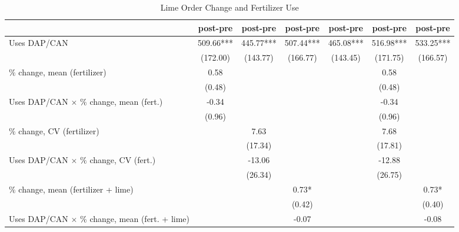 \begin{table}[htbp]
\centering
\hspace*{-1.2cm}
\begin{threeparttable}
\small
\caption{Lime Order Change and Fertilizer Use}
\label{tab:A2lime_int}
\begin{tabular}{l cccccc}
\hline
\hline
                    &\multicolumn{1}{c}{post-pre}&\multicolumn{1}{c}{post-pre}&\multicolumn{1}{c}{post-pre}&\multicolumn{1}{c}{post-pre}&\multicolumn{1}{c}{post-pre}&\multicolumn{1}{c}{post-pre}\\
\hline
Uses DAP/CAN        &      509.66***&      445.77***&      507.44***&      465.08***&      516.98***&      533.25***\\
                    &    (172.00)   &    (143.77)   &    (166.77)   &    (143.45)   &    (171.75)   &    (166.57)   \\
$\%$ change, mean (fertilizer)&        0.58   &               &               &               &        0.58   &               \\
                    &      (0.48)   &               &               &               &      (0.48)   &               \\
Uses DAP/CAN $\times$ $\%$ change, mean (fert.)&       -0.34   &               &               &               &       -0.34   &               \\
                    &      (0.96)   &               &               &               &      (0.96)   &               \\
$\%$ change, CV (fertilizer)&               &        7.63   &               &               &        7.68   &               \\
                    &               &     (17.34)   &               &               &     (17.81)   &               \\
Uses DAP/CAN $\times$ $\%$ change, CV (fert.)&               &      -13.06   &               &               &      -12.88   &               \\
                    &               &     (26.34)   &               &               &     (26.75)   &               \\
$\%$ change, mean (fertilizer + lime)&               &               &        0.73*  &               &               &        0.73*  \\
                    &               &               &      (0.42)   &               &               &      (0.40)   \\
Uses DAP/CAN $\times$ $\%$ change, mean (fert. + lime)&               &               &       -0.07   &               &               &       -0.08   \\

\end{tabular}
\end{threeparttable}
\end{table}
